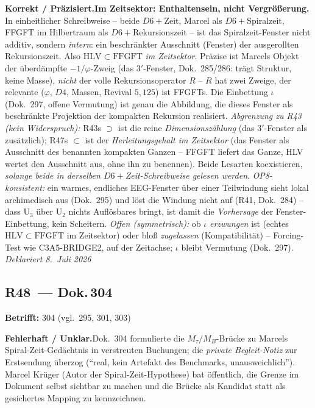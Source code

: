 \smallskip\noindent\textbf{Korrekt / Präzisiert.}\quad \textbf{Im Zeitsektor: Enthaltensein, nicht Vergrößerung.} In einheitlicher Schreibweise -- beide $D6+$Zeit, Marcel als $D6+$Spiralzeit, FFGFT im Hilbertraum als $D6+$Rekursionszeit -- ist das Spiralzeit-Fenster nicht additiv, sondern \emph{intern}: ein beschränkter Ausschnitt (Fenster) der ausgerollten Rekursionszeit. Also $\mathrm{HLV}\subset\mathrm{FFGFT}$ \emph{im Zeitsektor}. Präzise ist Marcels Objekt der überdämpfte $-1/\varphi$-Zweig (das $3'$-Fenster, Dok.~285/286: trägt Struktur, keine Masse), \emph{nicht} der volle Rekursionsoperator $R$ -- $R$ hat zwei Zweige, der relevante ($\varphi$, $D4$, Massen, Revival $5{,}125$) ist FFGFTs. Die Einbettung $\iota$ (Dok.~297, offene Vermutung) ist genau die Abbildung, die dieses Fenster als beschränkte Projektion der kompakten Rekursion realisiert. \emph{Abgrenzung zu R43 (kein Widerspruch):} R43s $\supset$ ist die reine \emph{Dimensionszählung} (das $3'$-Fenster als zusätzlich); R47s $\subset$ ist der \emph{Herleitungsgehalt im Zeitsektor} (das Fenster als Ausschnitt des benannten kompakten Ganzen -- FFGFT liefert das Ganze, HLV wertet den Ausschnitt aus, ohne ihn zu benennen). Beide Lesarten koexistieren, \emph{solange beide in derselben $D6+$Zeit-Schreibweise gelesen werden}. \emph{OP8-konsistent:} ein warmes, endliches EEG-Fenster über einer Teilwindung sieht lokal archimedisch aus (Dok.~295) und löst die Windung nicht auf (R41, Dok.~284) -- dass U$_3$ über U$_2$ nichts Auflösbares bringt, ist damit die \emph{Vorhersage} der Fenster-Einbettung, kein Scheitern. \emph{Offen (symmetrisch):} ob $\iota$ \emph{erzwungen} ist (echtes $\mathrm{HLV}\subset\mathrm{FFGFT}$ im Zeitsektor) oder bloß \emph{zugelassen} (Kompatibilität) -- Forcing-Test wie C3A5-BRIDGE2, auf der Zeitachse; $\iota$ bleibt Vermutung (Dok.~297).    \emph{Deklariert 8.~Juli 2026}


\medskip


\subsection*{R48~--- Dok.\,304}

\noindent\textbf{Betrifft:} 304 (vgl.\ 295, 301, 303)


\smallskip\noindent\textbf{Fehlerhaft / Unklar.}\quad Dok.~304 formulierte die $M_\tau/M_B$-Brücke zu Marcels Spiral-Zeit-Gedächtnis in verstreuten Buchungen; die \emph{private Begleit-Notiz} zur Erstsendung überzog (\enquote{real, kein Artefakt des Benchmarks, unausweichlich}). Marcel Krüger (Autor der Spiral-Zeit-Hypothese) bat öffentlich, die Grenze im Dokument selbst sichtbar zu machen und die Brücke als Kandidat statt als gesichertes Mapping zu kennzeichnen.


